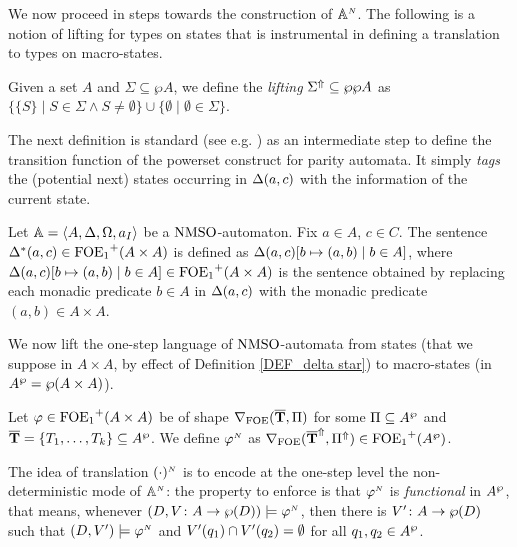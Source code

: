 We now proceed in steps towards the construction of $\mathbb{A}^{{\scriptscriptstyle N}}$. The following is a notion of lifting for types on states that is instrumental in defining a translation to types on macro-states. %
\begin{definition}
Given a set $A$ and $\Sigma \subseteq \wp A$, we define the \emph{lifting} $\Sigma^{\Uparrow} \subseteq \wp \wp A$ as $\{\{S\} \mid S \in \Sigma \wedge S \neq \emptyset\} \cup
    \{\emptyset \mid \emptyset \in \Sigma \}$.
\end{definition}

 The next definition is standard (see e.g.  \cite{Walukiewicz96,Ven08}) as an intermediate step to define the transition function of the powerset construct for parity automata. It simply \emph{tags} the (potential next) states occurring in $\Delta(a,c)$ with the information of the current state.

\begin{definition}\label{DEF_delta star} Let $\mathbb{A} = \langle{A,\Delta,\Omega,a_I}\rangle$ be a $\mathrm{NMSO}$-automaton. Fix $a \in A$, $c \in C$. The sentence $\Delta^{*}(a,c) \in {\ensuremath{\mathrm{FOE}_1}}^+(A\times A)$ is defined as $\Delta(a,c)[b \mapsto (a,b) \mid b \in A]$, where $\Delta(a,c)[b \mapsto (a,b) \mid b \in A] \in {\ensuremath{\mathrm{FOE}_1}}^+(A\times A)$ is the sentence obtained by replacing each monadic predicate $b \in A$ in $\Delta(a,c)$ with the monadic predicate $(a,b) \in A \times A$.
\end{definition}

We now lift the one-step language of $\mathrm{NMSO}$-automata from states (that we suppose in $A \times A$, by effect of Definition \ref{DEF_delta star}) to macro-states (in $A^{\wp} = \wp (A \times A)$).

\begin{definition}\label{DEF_finitary_lifting}
Let $\varphi \in {\ensuremath{\mathrm{FOE}_1}}^+(A \times A)$ be of shape $\nabla_{\mathrm{FOE}}(\overline{{\mathbf{T}}},\Pi)$ for some $\Pi \subseteq A^{\wp}$ and $\overline{{\mathbf{T}}} = \{T_1,\dots,T_k\} \subseteq A^{\wp}$. We define $\varphi^{{\scriptscriptstyle N}}$ as $\nabla_{\mathrm{FOE}}(\overline{{\mathbf{T}}}^{\Uparrow},\Pi^{\Uparrow}) \in {\ensuremath{\mathrm{FOE}_1}}^+(A^{\wp} )$.
\end{definition}

The idea of translation $(\cdot)^{{\scriptscriptstyle N}}$ is to encode at the one-step level the non-deterministic mode of $\mathbb{A}^{{\scriptscriptstyle N}}$: the property to enforce is that $\varphi^{{\scriptscriptstyle N}}$ is \emph{functional} in $A^{\wp}$, that means, whenever $(D,V \colon A \to \wp(D)) \models \varphi^{{\scriptscriptstyle N}}$, then there is $V'  \colon A \to \wp(D)$ such that $(D, V') \models \varphi^{{\scriptscriptstyle N}}$ and  $ V'(q_1)\cap V'(q_2) = \emptyset$ for all $q_1,q_2 \in A^{\wp}$. 

